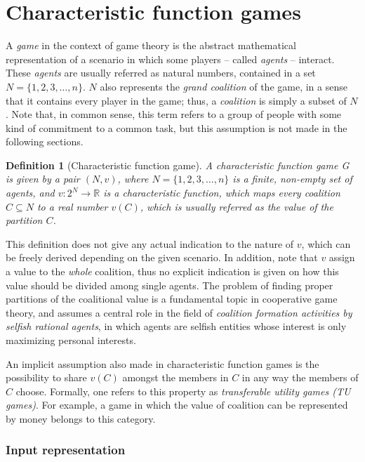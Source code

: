\documentclass[11pt, twoside, titlepage, a4paper, openright]{report}
\newtheorem{Def}{Definition}
\begin{document}
\section{Characteristic function games}

A \textit{game} in the context of game theory is the abstract mathematical representation of a scenario in which some players -- called \textit{agents} -- interact. These \textit{agents} are usually referred as natural numbers, contained in a set $N=\{1,2,3,\ldots,n\}$.
$N$ also represents the \textit{grand coalition} of the game, in a sense that it contains every player in the game; thus, a \textit{coalition} is simply a subset of $N$. Note that, in common sense, this term refers to a group of people with some kind of commitment to a common task, but this assumption is not made in the following sections.

\begin{Def}[Characteristic function game]\label{def:game}
A \textit{characteristic function game G} is given by a pair $(N,v)$, where $N=\{1,2,3,\ldots,n\}$ is a finite, non-empty set of agents, and $v : 2^{N} \to \mathbb{R}$ is a \textit{characteristic function}, which maps every coalition $C \subseteq N$ to a real number $v(C)$, which is usually referred as the \textit{value} of the partition $C$.
\end{Def}

\noindent This definition does not give any actual indication to the nature of $v$, which can be freely derived depending on the given scenario. In addition, note that $v$ assign a value to the \textit{whole} coalition, thus no explicit indication is given on how this value should be divided among single agents.
The problem of finding proper partitions of the coalitional value is a fundamental topic in cooperative game theory, and assumes a central role in the field of \textit{coalition formation activities by selfish rational agents}, in which agents are selfish entities whose interest is only maximizing personal interests.

\noindent An implicit assumption also made in characteristic function games is the possibility to share $v(C)$ amongst the members in $C$ in any way the members of $C$ choose. Formally, one refers to this property as \textit{transferable utility games (TU games)}. For example, a game in which the value of coalition can be represented by money belongs to this category.

\subsubsection{Input representation}
\end{document}
